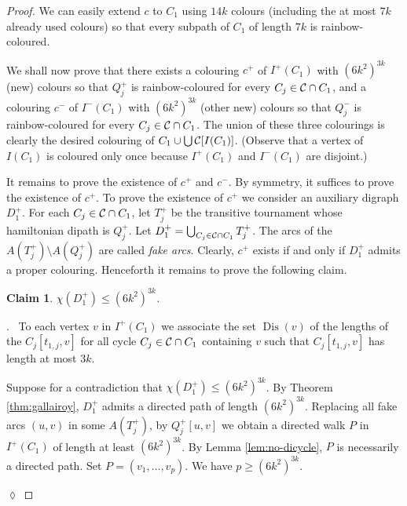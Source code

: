 \documentclass[utf8,10pt]{article}
\theoremstyle{plain}
\newtheorem{claim}{Claim}[theorem]
\theoremstyle{definition}
\theoremstyle{remark}
\newenvironment{subproof}{\par\noindent {\it Subproof}.\ }{\hfill$\lozenge$\par\vspace{11pt}}
\newcommand{\col}{(6k^2)^{3k}}
\DeclareMathOperator{\Dis}{Dis}
\begin{document}
\begin{proof}
We can easily extend $c$ to $C_1$ using $14k$ colours (including the at most $7k$ already used colours)
so that every subpath of $C_1$ of length $7k$ is rainbow-coloured.

We shall now prove that there exists a colouring $c^+$ of $I^+(C_1)$ with $\col$ (new) colours so that $Q^+_j$ is rainbow-coloured for every $C_j\in {\cal C}\cap C_1$, and a colouring $c^-$ of $I^-(C_1)$ with $\col$ (other new) colours so that $Q^-_j$ is rainbow-coloured for every $C_j\in {\cal C}\cap C_1$.
The union of these three colourings is clearly the desired colouring of $C_1\cup \bigcup{\cal C}[I(C_1)]$. (Observe that a vertex of $I(C_1)$ is coloured only once because  $I^+(C_1)$ and $I^-(C_1)$ are disjoint.)

It remains to prove the existence of $c^+$ and $c^-$. By symmetry, it suffices to prove the existence of $c^+$.
 To prove the existence of $c^+$ we consider an auxiliary digraph $D^+_1$.
 For each $C_j\in {\cal C}\cap C_1$, let $T^+_j$ be the transitive tournament whose hamiltonian dipath is $Q^+_j$.
Let $D^+_1=\bigcup_{C_j\in  {\cal C}\cap C_1} T^+_j$. 
The arcs of the $A(T^+_j)\setminus A(Q^+_j)$ are called {\it fake arcs}.
Clearly, $c^+$ exists if and only if $D^+_1$ admits a proper colouring. Henceforth it remains to prove the following claim.

\begin{claim}
$\chi(D^+_1) \leq  \col$.
\end{claim}

\begin{subproof}
To each vertex $v$ in $I^+(C_1)$ we associate the set $\Dis(v)$ of the lengths of the $C_j[t_{1,j},v]$ for all cycle $C_j\in {\cal C} \cap C_1$ containing $v$ such that $C_j[t_{1,j},v]$ has length at most $3k$.


Suppose for a contradiction that $\chi(D^+_1) \leq  \col$.
By Theorem \ref{thm:gallairoy}, $D^+_1$ admits a directed path of length $\col$. Replacing all fake arcs  $(u,v)$ in some $A(T^+_j)$, by 
$Q^+_j[u,v]$ we obtain a directed walk $P$ in $I^+(C_1)$ of length at least $\col$. By Lemma \ref{lem:no-dicycle}, $P$ is necessarily a directed path. Set $P=(v_1,  \dots , v_{p})$. We have $p\geq \col$.


\end{subproof}
\end{proof}
\end{document}
